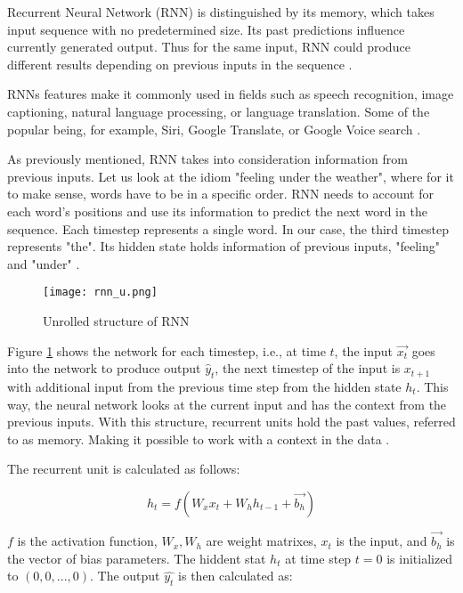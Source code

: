 Recurrent Neural Network (RNN) is distinguished by its memory, which takes input sequence with no predetermined size. Its past predictions influence currently generated output. Thus for the same input, RNN could produce different results depending on previous inputs in the sequence \cite{rnnDSmedium}.

RNNs features make it commonly used in fields such as speech recognition, image captioning, natural language processing, or language translation. Some of the popular being, for example, Siri, Google Translate, or Google Voice search \cite{ibmrnn}.

As previously mentioned, RNN takes into consideration information from previous inputs. Let us look at the idiom "feeling under the weather", where for it to make sense, words have to be in a specific order. RNN needs to account for each word's positions and use its information to predict the next word in the sequence. Each timestep represents a single word. In our case, the third timestep represents "the". Its hidden state holds information of previous inputs, "feeling" and "under" \cite{ibmrnn}.

\begin{figure}[h]
    \centering
    \texttt{[image: rnn\_u.png]}
    \caption{Unrolled structure of RNN \cite{matous}}
    \label{fig:rnn}
\end{figure}


Figure \ref{fig:rnn} shows the network for each timestep, i.e., at time $t$, the input $\vec{x_t}$ goes into the network to produce output $\hat{y}_t$, the next timestep of the input is $x_{t+1}$ with additional input from the previous time step from the hidden state $h_{t}$. This way, the neural network looks at the current input and has the context from the previous inputs.
With this structure, recurrent units hold the past values, referred to as memory. Making it possible to work with a context in the data \cite{rnnin6}.

The recurrent unit is calculated as follows:

\begin{equation}
    {h_t = f(W_{x}x_t + W_{h}h_{t-1}+\vec{b_h})}
\end{equation}

$f$ is the activation function, $W_x,W_h$ are weight matrixes, $x_t$ is the input, and $\vec{b_h}$ is the vector of bias parameters. The hiddent stat $h_t$ at time step $t=0$ is initialized to $(0,0,...,0)$. The output $\hat{y_t}$ is then calculated as:

